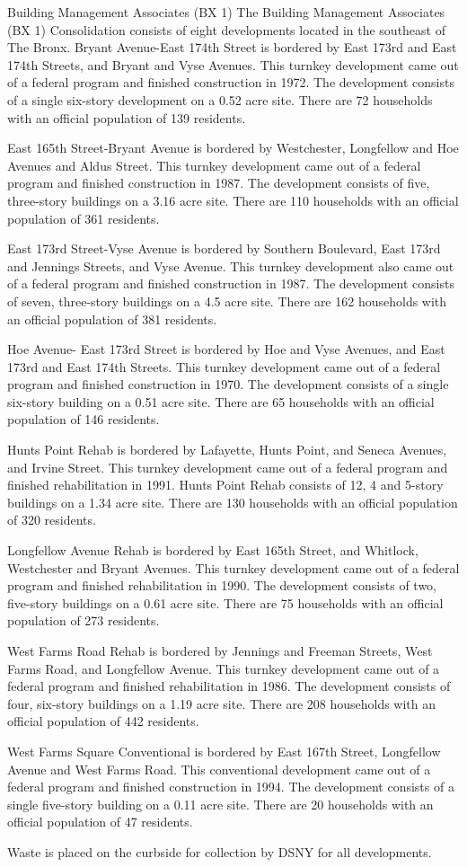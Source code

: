 Building Management Associates (BX 1)
The Building Management Associates (BX 1) Consolidation consists of eight developments located in the southeast of The Bronx. Bryant Avenue-East 174th Street is bordered by East 173rd and East 174th Streets, and Bryant and Vyse Avenues. This turnkey development came out of a federal program and finished construction in 1972. The development consists of a single six-story development on a 0.52 acre site. There are 72 households with an official population of 139 residents.

East 165th Street-Bryant Avenue is bordered by Westchester, Longfellow and Hoe Avenues and Aldus Street. This turnkey development came out of a federal program and finished construction in 1987. The development consists of five, three-story buildings on a 3.16 acre site. There are 110 households with an official population of 361 residents. 

East 173rd Street-Vyse Avenue is bordered by Southern Boulevard, East 173rd and Jennings Streets, and Vyse Avenue. This turnkey development also came out of a federal program and finished construction in 1987. The development consists of seven, three-story buildings on a 4.5 acre site. There are 162 households with an official population of 381 residents.

Hoe Avenue- East 173rd Street is bordered by Hoe and Vyse Avenues, and East 173rd and East 174th Streets. This turnkey development came out of a federal program and finished construction in 1970. The development consists of a single six-story building on a 0.51 acre site. There are 65 households with an official population of 146 residents.

Hunts Point Rehab is bordered by Lafayette, Hunts Point, and Seneca Avenues, and Irvine Street. This turnkey development came out of a federal program and finished rehabilitation in 1991. Hunts Point Rehab consists of 12, 4 and 5-story buildings on a 1.34 acre site. There are 130 households with an official population of 320 residents. 

Longfellow Avenue Rehab is bordered by East 165th Street, and Whitlock, Westchester and Bryant Avenues. This turnkey development came out of a federal program and finished rehabilitation in 1990. The development consists of two, five-story buildings on a 0.61 acre site. There are 75 households with an official population of 273 residents. 

West Farms Road Rehab is bordered by Jennings and Freeman Streets, West Farms Road, and Longfellow Avenue. This turnkey development came out of a federal program and finished rehabilitation in 1986. The development consists of four, six-story buildings on a 1.19 acre site. There are 208 households with an official population of 442 residents.

West Farms Square Conventional is bordered by East 167th Street, Longfellow Avenue and West Farms Road. This conventional development came out of a federal program and finished construction in 1994. The development consists of a single five-story building on a 0.11 acre site. There are 20 households with an official population of 47 residents.

Waste is placed on the curbside for collection by DSNY for all developments.